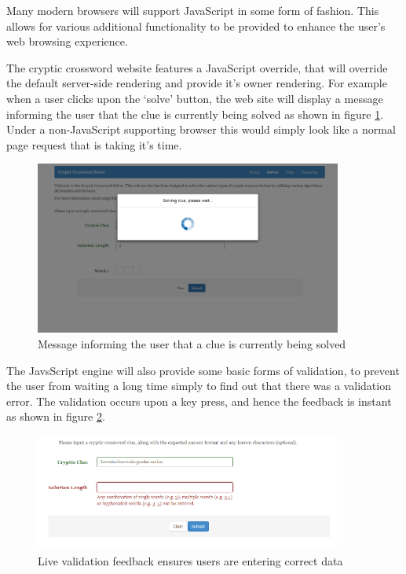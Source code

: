 Many modern browsers will support JavaScript in some form of fashion. This 
allows for various additional functionality to be provided to enhance the user's
web browsing experience.

The cryptic crossword website features a JavaScript override, that will override
the default server-side rendering and provide it's owner rendering. For example
when a user clicks upon the `solve' button, the web site will display a message
informing the user that the clue is currently being solved as shown in figure 
\ref{fig:solving_clue_message}. Under a non-JavaScript supporting browser this 
would simply look like a normal page request that is taking it's time.

\begin{figure}[H]
  \centering
  \includegraphics[width=0.9\textwidth]{images/solving_clue.png}
  \caption{Message informing the user that a clue is currently being solved}
  \label{fig:solving_clue_message}
\end{figure}

The JavsScript engine will also provide some basic forms of validation, to 
prevent the user from waiting a long time simply to find out that there was a 
validation error. The validation occurs upon a key press, and hence the feedback
is instant as shown in figure \ref{fig:validation_message}.

\begin{figure}[H]
  \centering
  \includegraphics[width=0.9\textwidth]{images/validation.png}
  \caption{Live validation feedback ensures users are entering correct data}
  \label{fig:validation_message}
\end{figure}

